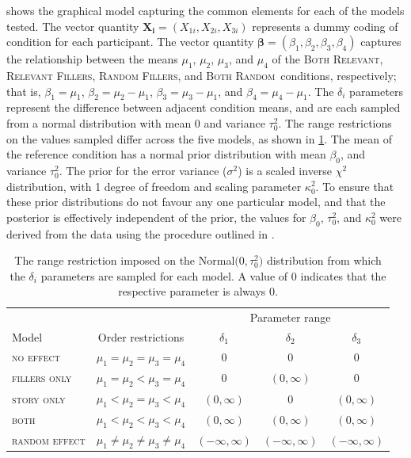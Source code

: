 \documentclass[doc,12pt]{apa}
\newcommand{\relevant}{\textsc{Both Relevant}}
\newcommand{\relevantdata}{\textsc{Relevant Fillers}}
\newcommand{\randomdata}{\textsc{Random Fillers}}
\newcommand{\random}{\textsc{Both Random}}
\begin{document}
 shows the graphical model capturing the common elements for each of the models tested. The vector quantity $\bm{X_i} = (X_{1i}, X_{2i}, X_{3i})$ represents a dummy coding of condition for each participant. The vector quantity $\bm{\beta} = (\beta_1, \beta_2, \beta_3, \beta_4)$ captures the relationship between the means $\mu_1$, $\mu_2$, $\mu_3$, and $\mu_4$ of the \relevant, \relevantdata, \randomdata, and \random\ conditions, respectively; that is, $\beta_1 = \mu_1$, $\beta_2 = \mu_2 - \mu_1$, $\beta_3 = \mu_3 - \mu_1$, and $\beta_4 = \mu_4 - \mu_1$. The $\delta_i$ parameters represent the difference between adjacent condition means, and are each sampled from a normal distribution with mean 0 and variance $\tau_0^2$. The range restrictions on the values sampled differ across the five models, as shown in \cref{tbl:betavalues}. The mean of the reference condition has a normal prior distribution with mean $\beta_0$, and variance $\tau_0^2$. The prior for the error variance ($\sigma^2$) is a scaled inverse $\chi^2$ distribution, with 1 degree of freedom and scaling parameter $\kappa_0^2$. To ensure that these prior distributions do not favour any one particular model, and that the posterior is effectively independent of the prior, the values for $\beta_0$, $\tau_0^2$, and $\kappa_0^2$ were derived from the data using the procedure outlined in .

\begin{table}[t]
\hspace{-5mm}
\small
\begin{tabular}{lcccc}
\toprule
 & & \multicolumn{3}{c}{Parameter range} \\
\cmidrule{3-5}
Model & Order restrictions & $\delta_1$ & $\delta_2$ & $\delta_3$ \\
\midrule
\textsc{no effect} & $ \mu_1 = \mu_2 = \mu_3 = \mu_4$ & 0 & 0 & 0 \\
\textsc{fillers only} & $ \mu_1 = \mu_2 < \mu_3 = \mu_4$ & 0 & $(0, \infty)$ & 0 \\
\textsc{story only} & $ \mu_1 < \mu_2 = \mu_3 < \mu_4$ & $(0, \infty)$  & 0 &
$(0, \infty)$ \\
\textsc{both} & $ \mu_1 < \mu_2 < \mu_3 < \mu_4$ &
$(0, \infty)$ &
$(0, \infty)$ &
$(0, \infty)$ \\
\textsc{random effect} & $ \mu_1 \neq \mu_2 \neq \mu_3 \neq \mu_4$ &
$(-\infty, \infty)$ &
$(-\infty, \infty)$ &
$(-\infty, \infty)$ \\
\bottomrule
\end{tabular}
\caption{%
The range restriction imposed on the Normal$\big(0, \tau_0^2\big)$ distribution from which the $\delta_i$ parameters are sampled for each model. A value of $0$ indicates that the respective parameter is always $0$.
}
\label{tbl:betavalues}
\end{table}





\end{document}
